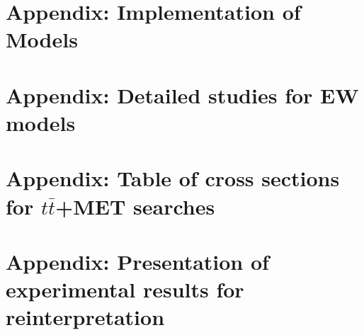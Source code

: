 \documentclass[a4paper,debug,notitlepage,nobib]{tufte-book}
\begin{document}
\chapter{Appendix: Implementation of Models}
\label{app:MonojetLikeModels_Appendix}


\chapter{Appendix: Detailed studies for EW models}
\label{app:EWSpecificModels_Appendix}


\chapter{\texorpdfstring{Appendix: Table of cross sections for $t\bar{t}$+MET searches}{Appendix: Table of cross sections for  ttbar+MET searches}}
\label{app:TTBar_Xsecs}


\chapter{Appendix: Presentation of experimental results for reinterpretation}
\label{app:Presentation_Of_Experimental_Results}


% 


\end{document}
